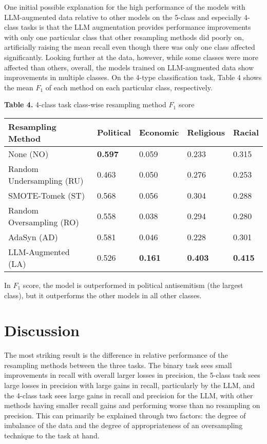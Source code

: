 \documentclass[runningheads]{llncs}
\newenvironment{nscenter}
 {\parskip=0pt\par\nopagebreak\centering}
 {\par\noindent\ignorespacesafterend}
\begin{document}
One initial possible explanation for the high performance of the models with LLM-augmented data relative to other models on the 5-class and especially 4-class tasks is that the LLM augmentation provides performance improvements with only one particular class that other resampling methods did poorly on, artificially raising the mean recall even though there was only one class affected significantly. Looking further at the data, however, while some classes were more affected than others, overall, the models trained on LLM-augmented data show improvements in multiple classes. On the 4-type classification task, Table 4 shows the mean $F_1$ of each method on each particular class, respectively.
\begin{nscenter}
{\bf Table 4.} 4-class task class-wise resampling method $F_1$ score\\

\begin{tabular}{|l|l|l|l|l|}
\hline
Resampling Method & Political & Economic & Religious & Racial \\\hline
None (NO) & {\bf 0.597} & 0.059 & 0.233 & 0.315 \\\hline
Random Undersampling (RU) & 0.463 & 0.050 & 0.276 & 0.253 \\\hline
SMOTE-Tomek (ST) & 0.568 & 0.056 & 0.304 & 0.288 \\\hline
Random Oversampling (RO) & 0.558 & 0.038 & 0.294 & 0.280 \\\hline
AdaSyn (AD) & 0.581 & 0.046 & 0.228 & 0.301 \\\hline
LLM-Augmented (LA) & 0.526 & {\bf 0.161} & {\bf 0.403} & {\bf 0.415} \\\hline
\end{tabular}
\end{nscenter}
In $F_1$ score, the model is outperformed in political antisemitism (the largest class), but it outperforms the other models in all other classes. 

\section{Discussion}
The most striking result is the difference in relative performance of the resampling methods between the three tasks. The binary task sees small improvements in recall with overall larger losses in precision, the 5-class task sees large losses in precision with large gains in recall, particularly by the LLM, and the 4-class task sees large gains in recall and precision for the LLM, with other methods having smaller recall gains and performing worse than no resampling on precision. This can primarily be explained through two factors: the degree of imbalance of the data and the degree of appropriateness of an oversampling technique to the task at hand.
\end{document}
